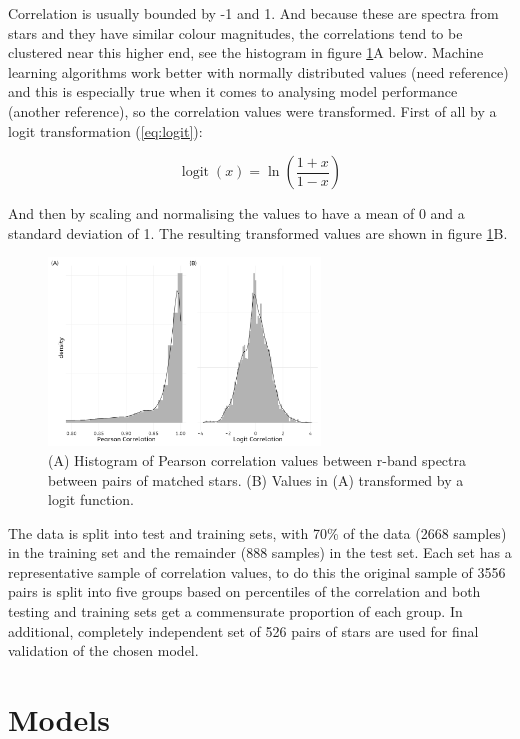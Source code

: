 \documentclass[preprint, 3p,
authoryear]{elsarticle} %
\begin{document}
Correlation is usually bounded by -1 and 1. And because these are
spectra from stars and they have similar colour magnitudes, the
correlations tend to be clustered near this higher end, see the
histogram in figure \ref{fig:histograms}A below. Machine learning
algorithms work better with normally distributed values (need reference)
and this is especially true when it comes to analysing model performance
(another reference), so the correlation values were transformed. First
of all by a logit transformation (\ref{eq:logit}):

\begin{equation}
  \displaystyle \operatorname {logit} (x)=\ln \left({\frac {1+x}{1-x}}\right)
  \label{eq:logit}
\end{equation}

And then by scaling and normalising the values to have a mean of 0 and a
standard deviation of 1. The resulting transformed values are shown in
figure \ref{fig:histograms}B.

\begin{figure}
  \includegraphics[width=\columnwidth, height = 5cm]{figures/histograms}
    \caption{(A) Histogram of Pearson correlation values between r-band spectra between pairs of matched stars. (B) Values in (A) transformed by a logit function.}
    \label{fig:histograms}
\end{figure}

The data is split into test and training sets, with 70\% of the data
(2668 samples) in the training set and the remainder (888 samples) in
the test set. Each set has a representative sample of correlation
values, to do this the original sample of 3556 pairs is split into five
groups based on percentiles of the correlation and both testing and
training sets get a commensurate proportion of each group. In
additional, completely independent set of 526 pairs of stars are used
for final validation of the chosen model.

\hypertarget{models}{%
\section{Models}\label{models}}
\end{document}
